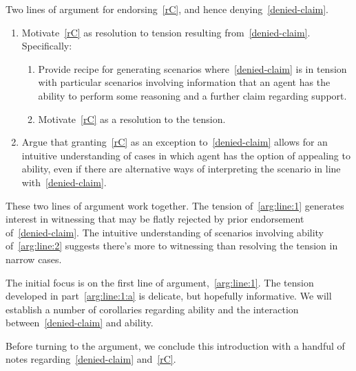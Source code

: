 \documentclass[10pt]{article}
\begin{document}
\begin{note}
  Two lines of argument for endorsing~\ref{rC}, and hence denying~\ref{denied-claim}.
  \begin{enumerate}[label=(L\arabic*), ref=(L\arabic*)]
  \item\label{arg:line:1} Motivate~\ref{rC} as resolution to tension resulting from~\ref{denied-claim}.\newline
    Specifically:
    \begin{enumerate}[label=(L1\alph*)]
    \item\label{arg:line:1:a} Provide recipe for generating scenarios where~\ref{denied-claim} is in tension with particular scenarios involving information that an agent has the ability to perform some reasoning and a further claim regarding support.
    \item\label{arg:line:1:b} Motivate~\ref{rC} as a resolution to the tension.
    \end{enumerate}
  \item\label{arg:line:2} Argue that granting~\ref{rC} as an exception to~\ref{denied-claim} allows for an intuitive understanding of cases in which agent has the option of appealing to ability, even if there are alternative ways of interpreting the scenario in line with~\ref{denied-claim}.
  \end{enumerate}
  These two lines of argument work together.
  The tension of~\ref{arg:line:1} generates interest in witnessing that may be flatly rejected by prior endorsement of~\ref{denied-claim}.
  The intuitive understanding of scenarios involving ability of~\ref{arg:line:2} suggests there's more to witnessing than resolving the tension in narrow cases.
\end{note}

\begin{note}
  The initial focus is on the first line of argument,~\ref{arg:line:1}.
  The tension developed in part~\ref{arg:line:1:a} is delicate, but hopefully informative.
  We will establish a number of corollaries regarding ability and the interaction between~\ref{denied-claim} and ability.
\end{note}

\begin{note}
  Before turning to the argument, we conclude this introduction with a handful of notes regarding~\ref{denied-claim} and~\ref{rC}.
\end{note}
\end{document}

